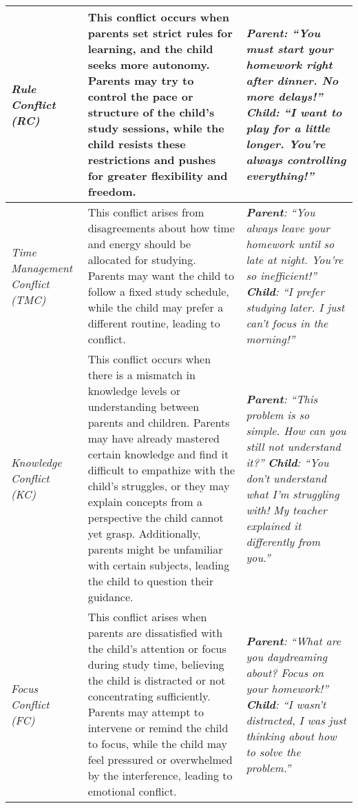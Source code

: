 \begin{table}
\begin{tabular}{p{} p{} p{}}
\midrule
\textit{Rule Conflict (RC)} & This conflict occurs when parents set strict rules for learning, and the child seeks more autonomy. Parents may try to control the pace or structure of the child’s study sessions, while the child resists these restrictions and pushes for greater flexibility and freedom. & \textit{\textbf{Parent}: “You must start your homework right after dinner. No more delays!”} \newline \textit{\textbf{Child}: “I want to play for a little longer. You’re always controlling everything!”} \\

\midrule
\textit{Time \newline Management Conflict (TMC)} & This conflict arises from disagreements about how time and energy should be allocated for studying. Parents may want the child to follow a fixed study schedule, while the child may prefer a different routine, leading to conflict. & \textit{\textbf{Parent}: “You always leave your homework until so late at night. You’re so inefficient!”} \newline \textit{\textbf{Child}: “I prefer studying later. I just can’t focus in the morning!”} \\

\midrule
\textit{Knowledge Conflict (KC)} & This conflict occurs when there is a mismatch in knowledge levels or understanding between parents and children. Parents may have already mastered certain knowledge and find it difficult to empathize with the child’s struggles, or they may explain concepts from a perspective the child cannot yet grasp. Additionally, parents might be unfamiliar with certain subjects, leading the child to question their guidance. & \textit{\textbf{Parent}: “This problem is so simple. How can you still not understand it?”} \newline \textit{\textbf{Child}: “You don’t understand what I’m struggling with! My teacher explained it differently from you.”} \\

\midrule
\textit{Focus Conflict (FC)} & This conflict arises when parents are dissatisfied with the child’s attention or focus during study time, believing the child is distracted or not concentrating sufficiently. Parents may attempt to intervene or remind the child to focus, while the child may feel pressured or overwhelmed by the interference, leading to emotional conflict. & \textit{\textbf{Parent}: “What are you daydreaming about? Focus on your homework!”} \newline \textit{\textbf{Child}: “I wasn’t distracted, I was just thinking about how to solve the problem.”} \\

\bottomrule
\end{tabular}
\end{table}